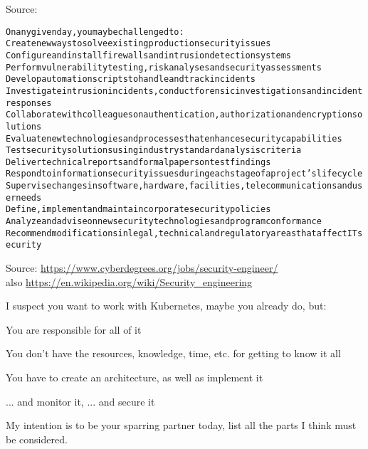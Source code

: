 \documentclass[Screen16to9,17pt]{foils}
\begin{document}
Source: 


\begin{alltt}\small
On any given day, you may be challenged to:
        Create new ways to solve existing production security issues
        Configure and install firewalls and intrusion detection systems
        Perform vulnerability testing, risk analyses and security assessments
        Develop automation scripts to handle and track incidents
        Investigate intrusion incidents, conduct forensic investigations and incident responses
        Collaborate with colleagues on authentication, authorization and encryption solutions
        Evaluate new technologies and processes that enhance security capabilities
        Test security solutions using industry standard analysis criteria
        Deliver technical reports and formal papers on test findings
        Respond to information security issues during each stage of a project’s lifecycle
        Supervise changes in software, hardware, facilities, telecommunications and user needs
        Define, implement and maintain corporate security policies
        Analyze and advise on new security technologies and program conformance
        Recommend modifications in legal, technical and regulatory areas that affect IT security
\end{alltt}

Source: \url{https://www.cyberdegrees.org/jobs/security-engineer/}\\
also
\url{https://en.wikipedia.org/wiki/Security_engineering}





I suspect you want to work with Kubernetes, maybe you already do, but:
\begin{list2}
\item You are responsible for all of it
\item You don't have the resources, knowledge, time, etc. for getting to know it all
\item You have to create an architecture, as well as implement it
\item ... and monitor it, ... and secure it
\end{list2}
My intention is to be your sparring partner today, list all the parts I think must be considered.
\end{document}
